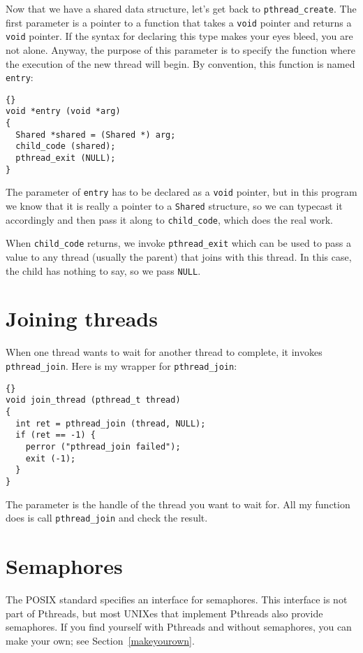 \documentclass{book}
\begin{document}
Now that we have a shared data structure, let's get back to
{\tt pthread\_create}.
The first parameter is a pointer to a function that takes
a {\tt void} pointer and returns a {\tt void} pointer.  If the syntax
for declaring this type makes your eyes bleed, you are not alone.
Anyway, the purpose of this parameter is to specify the function where
the execution of the new thread will begin.  By convention, this
function is named {\tt entry}:

\begin{lstlisting}[title={}]{}
void *entry (void *arg)
{
  Shared *shared = (Shared *) arg;
  child_code (shared);
  pthread_exit (NULL);
}
\end{lstlisting}

The parameter of {\tt entry} has to be declared as a {\tt void}
pointer, but in this program we know that it is really a pointer to a
{\tt Shared} structure, so we can typecast it accordingly and then
pass it along to {\tt child\_code}, which does the real work.

When {\tt child\_code} returns, we invoke {\tt pthread\_exit}
which can be used to pass a value to any thread (usually the
parent) that joins with this thread.  In this case, the child
has nothing to say, so we pass {\tt NULL}.


\section{Joining threads}

When one thread wants to wait for another thread to complete,
it invokes {\tt pthread\_join}.
Here is my wrapper for {\tt pthread\_join}:

\begin{lstlisting}[title={}]{}
void join_thread (pthread_t thread)
{
  int ret = pthread_join (thread, NULL);
  if (ret == -1) {
    perror ("pthread_join failed");
    exit (-1);
  }
}
\end{lstlisting}

The parameter is the handle of the thread you want to wait for.
All my function does is call {\tt pthread\_join} and check the
result.


\section{Semaphores}

The POSIX standard specifies an interface for semaphores.
This interface is not part of Pthreads, but most UNIXes
that implement Pthreads also provide semaphores.  If you
find yourself with Pthreads and without semaphores, you
can make your own; see Section~\ref{makeyourown}.
\end{document}
